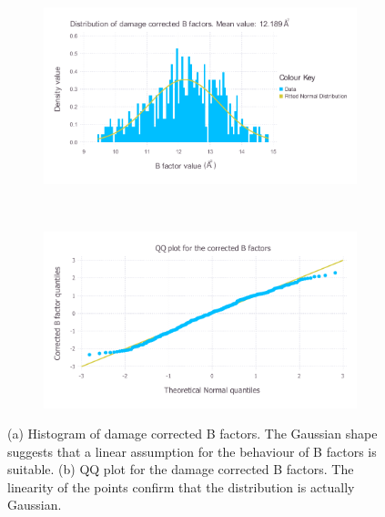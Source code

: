 \begin{figure}
    \centering
    \begin{subfigure}[b]{1.0\textwidth}
            \centering
            \includegraphics[width=\textwidth]{figures/datared/BFac_Distribution.pdf}
            \caption{}
            \label{fig:Damage corrected B factor distribution - insulin}
    \end{subfigure}
    \\
    \begin{subfigure}[b]{1.0\textwidth}
            \centering
            \includegraphics[width=\textwidth]{figures/datared/BFac_QQplot.pdf}
            \caption{}
            \label{fig:B factor QQ plot - insulin}
    \end{subfigure}
    \caption[Normality of calculated B factor distribution for the insulin dataset.]{(a) Histogram of damage corrected B factors.
    The Gaussian shape suggests that a linear assumption for the behaviour of B factors is suitable.
    (b) QQ plot for the damage corrected B factors.
    The linearity of the points confirm that the distribution is actually Gaussian.}
    \label{fig:Gaussian B factor plots - insulin}
\end{figure}


